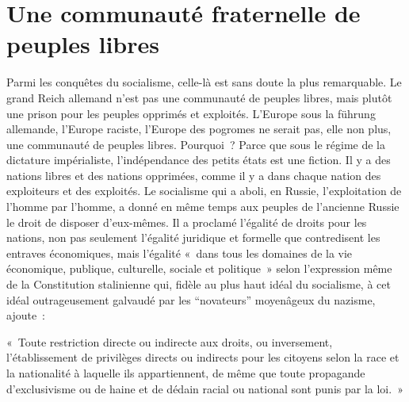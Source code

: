 \documentclass[french,twoside]{book} %
\newenvironment{quoteblock}%
  {\begin{quoting}}
  {\end{quoting}}
\newenvironment{quotebar}{%
    \def\FrameCommand{{\color{rubric!10!}\vrule width 0.5em} \hspace{0.9em}}%
    \def\OuterFrameSep{\itemsep} %
    \MakeFramed {\advance\hsize-\width \FrameRestore}
  }%
  {%
    \endMakeFramed
  }
\renewenvironment{quoteblock}%
  {%
    \savenotes
    \setstretch{0.9}
    \normalfont
    \begin{quotebar}
  }
  {%
    \end{quotebar}
    \spewnotes
  }
\begin{document}
\section[Une communauté fraternelle de peuples libres]{Une communauté fraternelle de peuples libres}
\noindent Parmi les conquêtes du socialisme, celle-là est sans doute la plus remarquable. Le grand Reich allemand n’est pas une communauté de peuples libres, mais plutôt une prison pour les peuples opprimés et exploités. L’Europe sous la führung allemande, l’Europe raciste, l’Europe des pogromes ne serait pas, elle non plus, une communauté de peuples libres. Pourquoi ? Parce que sous le régime de la dictature impérialiste, l’indépendance des petits états est une fiction. Il y a des nations libres et des nations opprimées, comme il y a dans chaque nation des exploiteurs et des exploités. Le socialisme qui a aboli, en Russie, l’exploitation de l’homme par l’homme, a donné en même temps aux peuples de l’ancienne Russie le droit de disposer d’eux-mêmes. Il a proclamé l’égalité de droits pour les nations, non pas seulement l’égalité juridique et formelle que contredisent les entraves économiques, mais l’égalité « dans tous les domaines de la vie économique, publique, culturelle, sociale et politique » selon l’expression même de la Constitution stalinienne qui, fidèle au plus haut idéal du socialisme, à cet idéal outrageusement galvaudé par les “novateurs” moyenâgeux du nazisme, ajoute :\par

\begin{quoteblock}
 \noindent « Toute restriction directe ou indirecte aux droits, ou inversement, l’établissement de privilèges directs ou indirects pour les citoyens selon la race et la nationalité à laquelle ils appartiennent, de même que toute propagande d’exclusivisme ou de haine et de dédain racial ou national sont punis par la loi. »
 \end{quoteblock}
\end{document}
